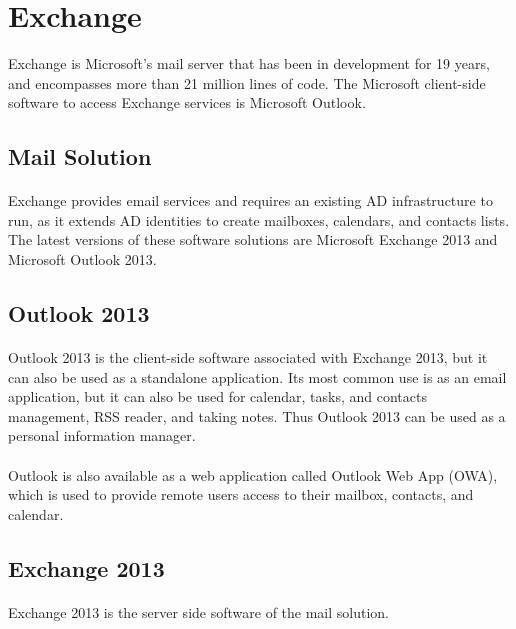 \section{Exchange}

Exchange is Microsoft's mail server that has been in development for 19 years, and encompasses more than 21 million lines of code.
The Microsoft client-side software to access Exchange services is Microsoft Outlook.

\subsection{Mail Solution}
\paragraph{}
 Exchange provides email services and requires an existing AD infrastructure to run, as it extends AD identities to create mailboxes, calendars, and contacts lists\cite[Ch. 1]{redmond_microsoft_2010}.
The latest versions of these software solutions are Microsoft Exchange 2013 and Microsoft Outlook 2013.

\subsection{Outlook 2013}
\paragraph{}
Outlook 2013 is the client-side software associated with Exchange 2013, but it can also be used as a standalone application. Its most common use is as an email application, but it can also be used for calendar, tasks, and contacts management, RSS reader, and taking notes. Thus Outlook 2013 can be used as a personal information manager.

\paragraph{}
Outlook is also available as a web application called Outlook Web App (OWA), which is used to provide remote users access to their mailbox, contacts, and calendar.


\subsection{Exchange 2013}
\paragraph{}
Exchange 2013 is the server side software of the mail solution.


